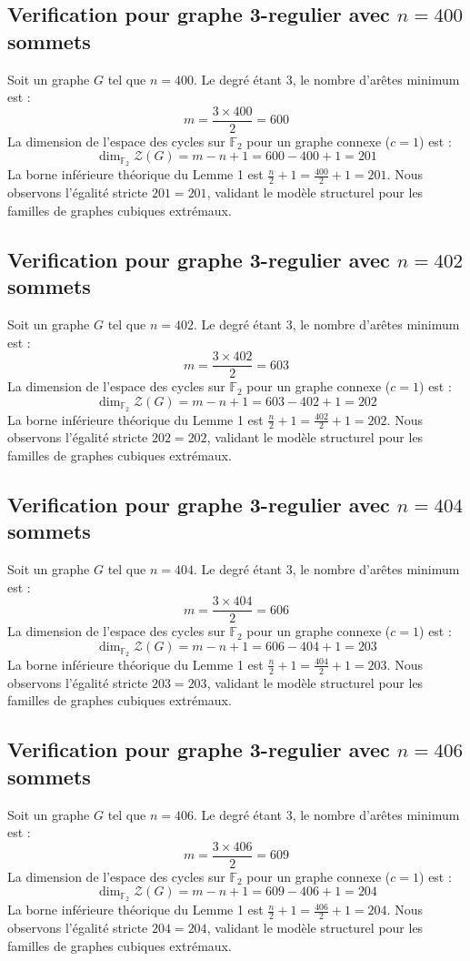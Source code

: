 \documentclass[11pt,a4paper]{article}
\begin{document}
\subsection{Verification pour graphe 3-regulier avec $n=400$ sommets}
Soit un graphe $G$ tel que $n = 400$. Le degré étant 3, le nombre d'arêtes minimum est :
$$ m = \frac{3 \times 400}{2} = 600 $$
La dimension de l'espace des cycles sur $\mathbb{F}_2$ pour un graphe connexe ($c=1$) est :
$$ \dim_{\mathbb{F}_2} \mathcal{Z}(G) = m - n + 1 = 600 - 400 + 1 = 201 $$
La borne inférieure théorique du Lemme 1 est $\frac{n}{2} + 1 = \frac{400}{2} + 1 = 201$.
Nous observons l'égalité stricte $201 = 201$, validant le modèle structurel pour les familles de graphes cubiques extrémaux.

\subsection{Verification pour graphe 3-regulier avec $n=402$ sommets}
Soit un graphe $G$ tel que $n = 402$. Le degré étant 3, le nombre d'arêtes minimum est :
$$ m = \frac{3 \times 402}{2} = 603 $$
La dimension de l'espace des cycles sur $\mathbb{F}_2$ pour un graphe connexe ($c=1$) est :
$$ \dim_{\mathbb{F}_2} \mathcal{Z}(G) = m - n + 1 = 603 - 402 + 1 = 202 $$
La borne inférieure théorique du Lemme 1 est $\frac{n}{2} + 1 = \frac{402}{2} + 1 = 202$.
Nous observons l'égalité stricte $202 = 202$, validant le modèle structurel pour les familles de graphes cubiques extrémaux.

\subsection{Verification pour graphe 3-regulier avec $n=404$ sommets}
Soit un graphe $G$ tel que $n = 404$. Le degré étant 3, le nombre d'arêtes minimum est :
$$ m = \frac{3 \times 404}{2} = 606 $$
La dimension de l'espace des cycles sur $\mathbb{F}_2$ pour un graphe connexe ($c=1$) est :
$$ \dim_{\mathbb{F}_2} \mathcal{Z}(G) = m - n + 1 = 606 - 404 + 1 = 203 $$
La borne inférieure théorique du Lemme 1 est $\frac{n}{2} + 1 = \frac{404}{2} + 1 = 203$.
Nous observons l'égalité stricte $203 = 203$, validant le modèle structurel pour les familles de graphes cubiques extrémaux.

\subsection{Verification pour graphe 3-regulier avec $n=406$ sommets}
Soit un graphe $G$ tel que $n = 406$. Le degré étant 3, le nombre d'arêtes minimum est :
$$ m = \frac{3 \times 406}{2} = 609 $$
La dimension de l'espace des cycles sur $\mathbb{F}_2$ pour un graphe connexe ($c=1$) est :
$$ \dim_{\mathbb{F}_2} \mathcal{Z}(G) = m - n + 1 = 609 - 406 + 1 = 204 $$
La borne inférieure théorique du Lemme 1 est $\frac{n}{2} + 1 = \frac{406}{2} + 1 = 204$.
Nous observons l'égalité stricte $204 = 204$, validant le modèle structurel pour les familles de graphes cubiques extrémaux.
\end{document}
